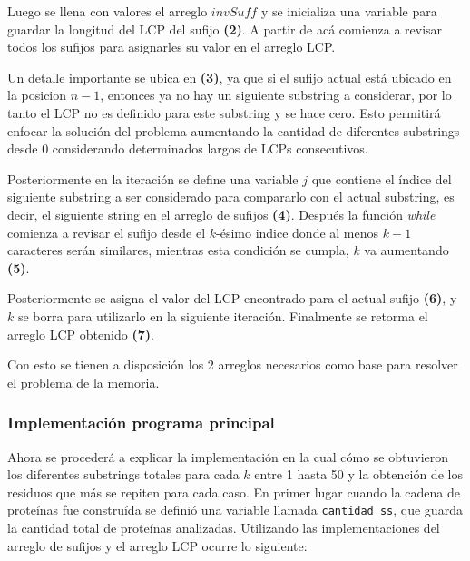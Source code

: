 Luego se llena con valores el arreglo $invSuff$ y se inicializa una variable para guardar la longitud del LCP del sufijo \textbf{(2)}. A partir de acá comienza a revisar todos los sufijos para asignarles su valor en el arreglo LCP.

Un detalle importante se ubica en \textbf{(3)}, ya que si el sufijo actual está ubicado en la posicion $n-1$, entonces ya no hay un siguiente substring a considerar, por lo tanto el LCP no es definido para este substring y se hace cero. Esto permitirá enfocar la solución del problema aumentando la cantidad de diferentes substrings desde 0 considerando determinados largos de LCPs consecutivos.

Posteriormente en la iteración se define una variable $j$ que contiene el índice del siguiente substring a ser considerado para compararlo con el actual substring, es decir, el siguiente string en el arreglo de sufijos \textbf{(4)}. Después la función \textit{while} comienza a revisar el sufijo desde el $k$-ésimo indice donde al menos $k-1$ caracteres serán similares, mientras esta condición se cumpla, $k$ va aumentando \textbf{(5)}.

Posteriormente se asigna el valor del LCP encontrado para el actual sufijo \textbf{(6)}, y $k$ se borra para utilizarlo en la siguiente iteración. Finalmente se retorma el arreglo LCP obtenido \textbf{(7)}.

Con esto se tienen a disposición los 2 arreglos necesarios como base para resolver el problema de la memoria.

\subsubsection{Implementación programa principal}

Ahora se procederá a explicar la implementación en la cual cómo se obtuvieron los diferentes substrings totales para cada $k$ entre 1 hasta 50 y la obtención de los residuos que más se repiten para cada caso. En primer lugar cuando la cadena de proteínas fue construída se definió una variable llamada \texttt{cantidad\_ss}, que guarda la cantidad total de proteínas analizadas. Utilizando las implementaciones del arreglo de sufijos y el arreglo LCP ocurre lo siguiente:

